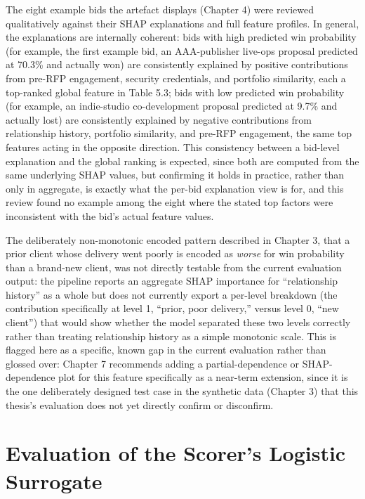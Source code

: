 The eight example bids the artefact displays (Chapter 4) were reviewed
qualitatively against their SHAP explanations and full feature profiles.
In general, the explanations are internally coherent: bids with high
predicted win probability (for example, the first example bid, an
AAA-publisher live-ops proposal predicted at 70.3\% and actually won)
are consistently explained by positive contributions from pre-RFP
engagement, security credentials, and portfolio similarity, each a
top-ranked global feature in Table 5.3; bids with low predicted win
probability (for example, an indie-studio co-development proposal
predicted at 9.7\% and actually lost) are consistently explained by
negative contributions from relationship history, portfolio similarity,
and pre-RFP engagement, the same top features acting in the opposite
direction. This consistency between a bid-level explanation and the
global ranking is expected, since both are computed from the same
underlying SHAP values, but confirming it holds in practice, rather than
only in aggregate, is exactly what the per-bid explanation view is for,
and this review found no example among the eight where the stated top
factors were inconsistent with the bid's actual feature values.

The deliberately non-monotonic encoded pattern described in Chapter 3,
that a prior client whose delivery went poorly is encoded as
\emph{worse} for win probability than a brand-new client, was not
directly testable from the current evaluation output: the pipeline
reports an aggregate SHAP importance for ``relationship history'' as a
whole but does not currently export a per-level breakdown (the
contribution specifically at level 1, ``prior, poor delivery,'' versus
level 0, ``new client'') that would show whether the model separated
these two levels correctly rather than treating relationship history as
a simple monotonic scale. This is flagged here as a specific, known gap
in the current evaluation rather than glossed over: Chapter 7 recommends
adding a partial-dependence or SHAP-dependence plot for this feature
specifically as a near-term extension, since it is the one deliberately
designed test case in the synthetic data (Chapter 3) that this thesis's
evaluation does not yet directly confirm or disconfirm.

\hypertarget{evaluation-of-the-scorers-logistic-surrogate}{%
\section{Evaluation of the Scorer's Logistic
Surrogate}\label{evaluation-of-the-scorers-logistic-surrogate}}

